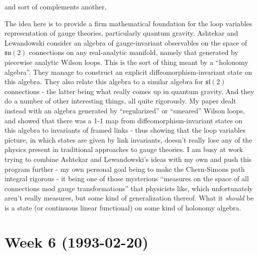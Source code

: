 \documentclass{article}
\def\tightlist{}
\renewcommand{\texttt}[1]{%
  \begingroup
  \ttfamily
  \begingroup\lccode`~=`/\lowercase{\endgroup\def~}{/\discretionary{}{}{}}%
  \begingroup\lccode`~=`[\lowercase{\endgroup\def~}{[\discretionary{}{}{}}%
  \begingroup\lccode`~=`.\lowercase{\endgroup\def~}{.\discretionary{}{}{}}%
  \catcode`/=\active\catcode`[=\active\catcode`.=\active
  \scantokens{#1\noexpand}%
  \endgroup
}
\begin{document}
and sort of complements another,


The idea here is to provide a firm mathematical foundation for the loop
variables representation of gauge theories, particularly quantum
gravity. Ashtekar and Lewandowski consider an algebra of gauge-invariant
observables on the space of \(\mathfrak{su}(2)\) connections on any
real-analytic manifold, namely that generated by piecewise analytic
Wilson loops. This is the sort of thing meant by a ``holonomy algebra''.
They manage to construct an explicit diffeomorphism-invariant state on
this algebra. They also relate this algebra to a similar algebra for
\(\mathfrak{sl}(2)\) connections - the latter being what really comes up
in quantum gravity. And they do a number of other interesting things,
all quite rigorously. My paper dealt instead with an algebra generated
by ``regularized'' or ``smeared'' Wilson loops, and showed that there
was a 1-1 map from diffeomorphism-invariant states on this algebra to
invariants of framed links - thus showing that the loop variables
picture, in which states are given by link invariants, doesn't really
lose any of the physics present in traditional approaches to gauge
theories. I am busy at work trying to combine Ashtekar and Lewandowski's
ideas with my own and push this program further - my own personal goal
being to make the Chern-Simons path integral rigorous - it being one of
those mysterious ``measures on the space of all connections mod gauge
transformations'' that physicists like, which unfortunately aren't
really measures, but some kind of generalization thereof. What it
\emph{should} be is a state (or continuous linear functional) on some
kind of holonomy algebra.
\hypertarget{week-6-1993-02-20}{%
\section{Week 6 (1993-02-20)}\label{week-6-1993-02-20}}

\end{document}

